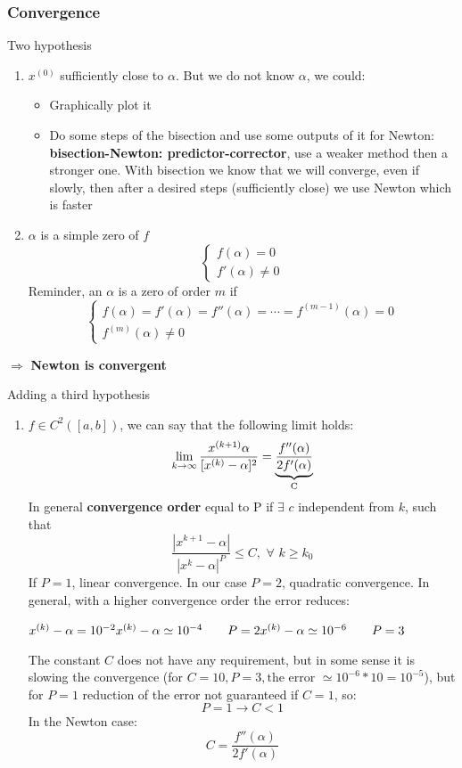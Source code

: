 \subsubsection{Convergence}
Two hypothesis
\begin{enumerate}[H1)]
    \item $x^{(0)}$ sufficiently close to $\alpha$. But we do not know $\alpha$, we could:
    \begin{itemize}
        \item Graphically plot it
        \item Do some steps of the bisection and use some outputs of it for Newton: \textbf{bisection-Newton: predictor-corrector}, use a weaker method then a stronger one. With bisection we know that we will converge, even if slowly, then after a desired steps (sufficiently close) we use Newton which is faster
    \end{itemize}
    \item $\alpha$ is a simple zero of $f$
    $$
    \begin{cases}
        f(\alpha)=0\\
        f'(\alpha)\neq 0
    \end{cases}
    $$
    Reminder, an $\alpha$ is a zero of order $m$ if
    $$
    \begin{cases}
        f(\alpha)=f'(\alpha)=f''(\alpha)=\cdots=f^{(m-1)}(\alpha)=0\\
        f^{(m)}(\alpha)\neq 0        
    \end{cases}
    $$
\end{enumerate}
$\mathbf{\Rightarrow}$ \textbf{Newton is convergent}

Adding a third hypothesis
\begin{enumerate}[H3)]
    \item $f\in C^2([a,b])$, we can say that the following limit holds:
    $$\lim_{k\rightarrow\infty}\frac{
        x^{(k+1)}\alpha
    }{[x^{(k)}-\alpha]^2}=
    \underlabel{\frac{f''(\alpha)}{2f'(\alpha)}}{C}$$
    In general \textbf{convergence order} equal to P if $\exists\,\,c$ independent from $k$, such that
    $$\frac{|x^{k+1}-\alpha|}{|x^k-\alpha|^P}\leq C,\,\,\forall\,\,k\geq k_0$$
    If $P=1$, linear convergence. In our case $P=2$, quadratic convergence. In general, with a higher convergence order the error reduces:
    
    $
    x^{(k)}-\alpha=10^{-2}\\
    x^{(k)}-\alpha\simeq 10^{-4}\qquad P=2\\
    x^{(k)}-\alpha\simeq 10^{-6}\qquad P=3
    $

    The constant $C$ does not have any requirement, but in some sense it is slowing the convergence (for $C=10,P=3,\text{the error }\simeq 10^{-6}*10=10^{-5}$), but for $P=1$ reduction of the error not guaranteed if $C=1$, so:
    $$P=1\rightarrow C<1$$
    In the Newton case:
    $$C=\frac{f''(\alpha)}{2f'(\alpha)}$$
\end{enumerate}
